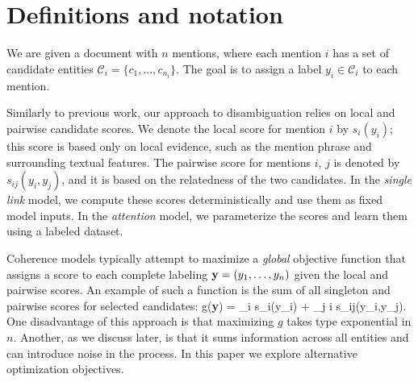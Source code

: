 

\section{Definitions and notation}

We are given a document with $n$ mentions, where each mention $i$ has a set of candidate entities $\mathcal{C}_i = \{c_1, ..., c_{n_i}\}$. The goal is to assign a label $y_i \in \mathcal{C}_i$ to each mention.

Similarly to previous work, our approach to disambiguation relies on local and pairwise candidate scores. We denote the local score for mention $i$ by $s_i(y_i)$; this score is based only on local evidence, such as the mention phrase and surrounding textual features. The pairwise score for mentions $i$, $j$ is denoted by $s_{ij}(y_i, y_j)$,  and it is based on the relatedness of the two candidates. In the \emph{single link} model, we compute these scores deterministically and use them as fixed model inputs. In the \emph{attention} model, we parameterize the scores and learn them using a labeled dataset.

Coherence models typically attempt to maximize a {\em global} objective function that assigns a score to each complete labeling ${\bf y} = (y_1,\ldots, y_n)$ given the local and pairwise scores. An example of such a function is the sum of all singleton and pairwise scores for selected candidates:
\be
g({\bf y}) = \sum_i s_i(y_i) + \sum_{j \neq i} s_{ij}(y_i,y_j).
\label{eq:global_obj}
\ee 
One disadvantage of this approach is that maximizing $g$ takes type exponential in $n$. Another, as we discuss later, is that it sums information across all entities and can introduce noise in the process. In this paper we explore alternative optimization objectives.
